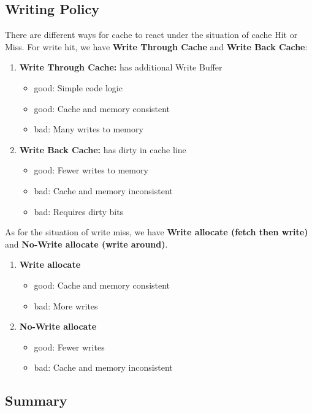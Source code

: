 \documentclass{article}
\begin{document}
\subsection{Writing Policy}
There are different ways for cache to react under the situation of cache Hit or Miss. For write hit, we have \textbf{Write Through Cache} and \textbf{Write Back Cache}:
\begin{enumerate}
    \item \textbf{Write Through Cache: }has additional Write Buffer
        \begin{itemize}
            \item good: Simple code logic
            \item good: Cache and memory consistent
            \item bad: Many writes to memory
        \end{itemize}
    \item \textbf{Write Back Cache: }has dirty in cache line
        \begin{itemize}
            \item good: Fewer writes to memory
            \item bad: Cache and memory inconsistent
            \item bad: Requires dirty bits
        \end{itemize}
\end{enumerate}
As for the situation of write miss, we have \textbf{Write allocate (fetch then write)} and \textbf{No-Write allocate (write around)}.
\begin{enumerate}
    \item \textbf{Write allocate}
        \begin{itemize}
            \item good: Cache and memory consistent
            \item bad: More writes
        \end{itemize}
    \item \textbf{No-Write allocate}
        \begin{itemize}
            \item good: Fewer writes
            \item bad: Cache and memory inconsistent
        \end{itemize}
\end{enumerate}

\subsection{Summary}
\end{document}
